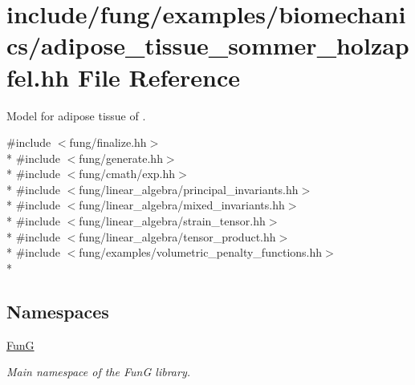 \hypertarget{adipose__tissue__sommer__holzapfel_8hh}{\section{include/fung/examples/biomechanics/adipose\-\_\-tissue\-\_\-sommer\-\_\-holzapfel.hh File Reference}
\label{adipose__tissue__sommer__holzapfel_8hh}
}


Model for adipose tissue of \cite{Sommer2013}.  


{\ttfamily \#include $<$fung/finalize.\-hh$>$}\\*
{\ttfamily \#include $<$fung/generate.\-hh$>$}\\*
{\ttfamily \#include $<$fung/cmath/exp.\-hh$>$}\\*
{\ttfamily \#include $<$fung/linear\-\_\-algebra/principal\-\_\-invariants.\-hh$>$}\\*
{\ttfamily \#include $<$fung/linear\-\_\-algebra/mixed\-\_\-invariants.\-hh$>$}\\*
{\ttfamily \#include $<$fung/linear\-\_\-algebra/strain\-\_\-tensor.\-hh$>$}\\*
{\ttfamily \#include $<$fung/linear\-\_\-algebra/tensor\-\_\-product.\-hh$>$}\\*
{\ttfamily \#include $<$fung/examples/volumetric\-\_\-penalty\-\_\-functions.\-hh$>$}\\*
\subsection*{Namespaces}
\begin{DoxyCompactItemize}
\item 
\hyperlink{namespaceFunG}{Fun\-G}
\begin{DoxyCompactList}\small\item\em Main namespace of the Fun\-G library. \end{DoxyCompactList}\end{DoxyCompactItemize}

